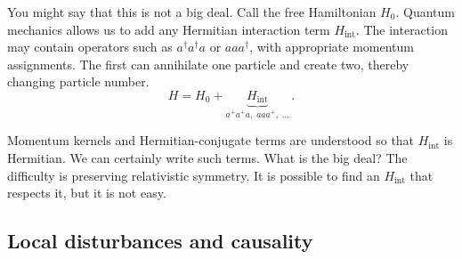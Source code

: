 You might say that this is not a big deal. Call the free Hamiltonian $H_0$.
Quantum mechanics allows us to add any Hermitian interaction term
$H_{\mathrm{int}}$.
The interaction may contain operators such as $a^\dagger a^\dagger a$ or $a a
a^\dagger$, with appropriate momentum assignments. The first can annihilate one
particle and create two, thereby changing particle number.
\begin{equation}
  H=H_0+
  \underbrace{H_{\mathrm{int}}}_{
    a^{+}a^{+}a,\;aaa^{+},\;\ldots}\, .
  \label{eq:253a-interaction-examples}
\end{equation}

Momentum kernels and Hermitian-conjugate terms are understood so that
$H_{\mathrm{int}}$ is Hermitian.
We can certainly write such terms. What is the big deal?
The difficulty is preserving relativistic symmetry. It is possible to find an
$H_{\mathrm{int}}$ that respects it, but it is not easy.

\subsection{Local disturbances and causality}
\label{sec:253a-causality}

